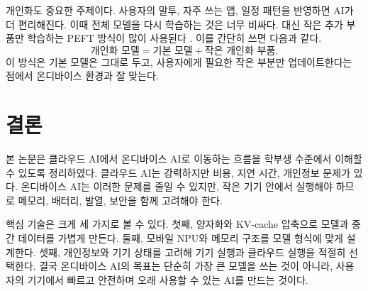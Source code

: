 \documentclass[twocolumn,10pt]{article}
\begin{document}
개인화도 중요한 주제이다. 사용자의 말투, 자주 쓰는 앱, 일정 패턴을 반영하면 AI가 더 편리해진다. 이때 전체 모델을 다시 학습하는 것은 너무 비싸다. 대신 작은 추가 부품만 학습하는 PEFT 방식이 많이 사용된다 \cite{dora2024,minions2025}. 이를 간단히 쓰면 다음과 같다.
\begin{equation}
\text{개인화 모델} = \text{기본 모델} + \text{작은 개인화 부품}.
\label{eq:ko_peft_simple}
\end{equation}
이 방식은 기본 모델은 그대로 두고, 사용자에게 필요한 작은 부분만 업데이트한다는 점에서 온디바이스 환경과 잘 맞는다.

\section{결론}
본 논문은 클라우드 AI에서 온디바이스 AI로 이동하는 흐름을 학부생 수준에서 이해할 수 있도록 정리하였다. 클라우드 AI는 강력하지만 비용, 지연 시간, 개인정보 문제가 있다. 온디바이스 AI는 이러한 문제를 줄일 수 있지만, 작은 기기 안에서 실행해야 하므로 메모리, 배터리, 발열, 보안을 함께 고려해야 한다.

핵심 기술은 크게 세 가지로 볼 수 있다. 첫째, 양자화와 KV-cache 압축으로 모델과 중간 데이터를 가볍게 만든다. 둘째, 모바일 NPU와 메모리 구조를 모델 형식에 맞게 설계한다. 셋째, 개인정보와 기기 상태를 고려해 기기 실행과 클라우드 실행을 적절히 선택한다. 결국 온디바이스 AI의 목표는 단순히 가장 큰 모델을 쓰는 것이 아니라, 사용자의 기기에서 빠르고 안전하며 오래 사용할 수 있는 AI를 만드는 것이다.



\end{document}
